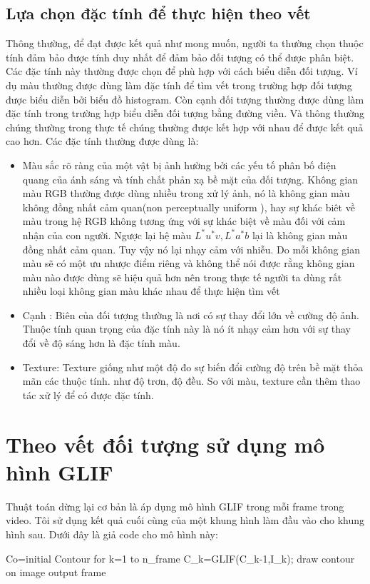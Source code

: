 \documentclass[12pt,oneside,a4]{report}
\begin{document}
\subsection{Lựa chọn đặc tính để thực hiện theo vết}
Thông thường, để đạt được kết quả như mong muốn, người ta thường chọn thuộc tính đảm bảo được tính duy nhất để đảm bảo đối tượng có thể được phân biệt. Các đặc tính này thường được chọn để phù hợp với cách biểu diễn đối tượng. Ví dụ màu thường được dùng làm đặc tính để tìm vết trong trường hợp đối tượng được biểu diễn bởi biểu đồ histogram. Còn cạnh đối tượng thường được dùng làm đặc tính trong trường hợp biểu diễn đối tượng bằng đường viền. Và thông thường chúng thường trong thực tế chúng thường được kết hợp với nhau để được kết quả cao hơn. Các đặc tính thường được dùng là:
\begin{itemize}

\item Màu sắc rõ ràng của một vật bị ảnh hường bởi các yếu tố  phân bố điện quang của ánh sáng và tính chất phản xạ bề mặt của đối tượng. Không gian màu RGB thường được dùng nhiều trong xử lý ảnh, nó là không gian màu không đồng nhất cảm quan(non perceptually uniform ), hay sự khác biêt về màu trong hệ RGB không tương ứng với sự khác biệt về màu đối với cảm nhận của con người. Ngược lại hệ màu $L^*u^*v, L^*a^*b$ lại là không gian màu đồng nhất cảm quan. Tuy vậy nó lại nhạy cảm với nhiễu. Do  mỗi không gian màu sẽ có một ưu nhược điểm riêng và không thể nói được rằng không gian màu nào được dùng sẽ hiệu quả hơn nên trong thực tế người ta dùng rất nhiều loại không gian màu khác nhau để thực hiện tìm vết
\item Cạnh : Biên của đối tượng thường là nơi có sự thay đổi lớn về cường độ ảnh. Thuộc tính quan trọng của đặc tính này là nó ít nhạy cảm hơn với sự thay đổi về độ sáng hơn là đặc tính màu. 

\item Texture: Texture giống như một độ đo sự biến đổi cường độ trên bề mặt thỏa mãn các thuộc tính. như độ trơn, độ đều. So với màu, texture cần thêm thao tác xử lý để có được đặc tính. 

\end{itemize}
\section{Theo vết đối tượng sử dụng mô hình GLIF}
Thuật toán dừng lại cơ bản là áp dụng mô hình GLIF trong mỗi frame trong video. Tôi sử dụng kết quả cuối cùng của một khung hình làm đầu vào cho khung hình sau. Dưới đây là giả code cho mô hình này:
\begin{listing}
Co=initial Contour
for k=1 to n_frame
{
C_k=GLIF(C_{k-1},I_{k});
draw contour on image
output frame
}

\end{listing}
\end{document}
